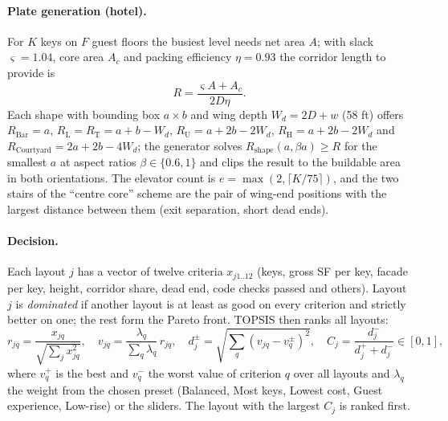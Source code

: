 \documentclass[10pt]{article}
\begin{document}
\paragraph{Plate generation (hotel).} For $K$ keys on $F$ guest floors the busiest level needs net area $A$; with slack
$\varsigma = 1.04$, core area $A_c$ and packing efficiency $\eta = 0.93$ the corridor length to provide is
\[ R = \frac{\varsigma A + A_c}{2 D \eta}. \]
Each shape with bounding box $a \times b$ and wing depth $W_d = 2D + w$ (58 ft) offers
$R_{\text{Bar}} = a$, $R_{\text{L}} = R_{\text{T}} = a + b - W_d$, $R_{\text{U}} = a + 2b - 2W_d$,
$R_{\text{H}} = a + 2b - 2W_d$ and $R_{\text{Courtyard}} = 2a + 2b - 4W_d$; the generator solves $R_{\text{shape}}(a, \beta a) \ge R$
for the smallest $a$ at aspect ratios $\beta \in \{0.6, 1\}$ and clips the result to the buildable area in both
orientations. The elevator count is $e = \max(2, \lceil K/75 \rceil)$, and the two stairs of the ``centre core'' scheme are
the pair of wing-end positions with the largest distance between them (exit separation, short dead ends).

\paragraph{Decision.} Each layout $j$ has a vector of twelve criteria $x_{j1..12}$ (keys, gross SF per key, facade per key,
height, corridor share, dead end, code checks passed and others). Layout $j$ is \emph{dominated} if another layout is at
least as good on every criterion and strictly better on one; the rest form the Pareto front. TOPSIS then ranks all layouts:
\[ r_{jq} = \frac{x_{jq}}{\sqrt{\sum_j x_{jq}^2}}, \quad v_{jq} = \frac{\lambda_q}{\sum_q \lambda_q}\, r_{jq}, \quad
d_j^{\pm} = \sqrt{\sum_q (v_{jq} - v_q^{\pm})^2}, \quad C_j = \frac{d_j^-}{d_j^+ + d_j^-} \in [0,1], \]
where $v_q^+$ is the best and $v_q^-$ the worst value of criterion $q$ over all layouts and $\lambda_q$ the weight from the
chosen preset (Balanced, Most keys, Lowest cost, Guest experience, Low-rise) or the sliders. The layout with the largest
$C_j$ is ranked first.
\end{document}
